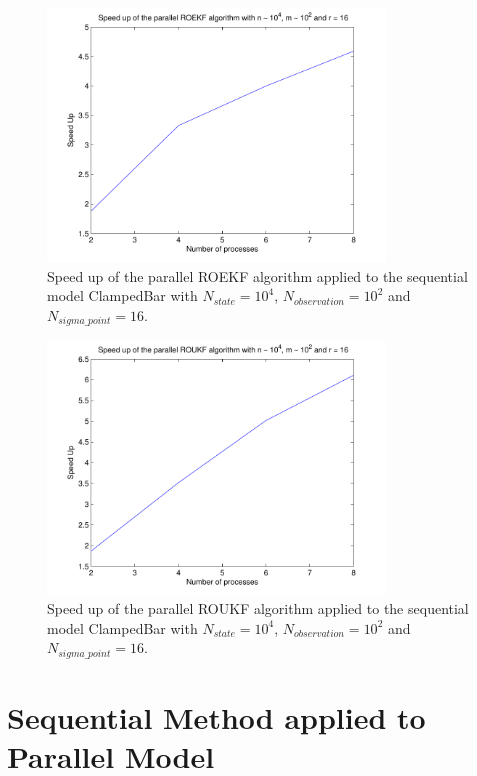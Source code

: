 \begin{figure}
    \caption{\label{titre2} Speed up of the parallel ROEKF algorithm applied to the sequential model ClampedBar with $N_{state} = 10^4$, $N_{observation} = 10^2$ and $N_{sigma\_point} = 16$.}

 \includegraphics[width=0.8\textwidth]{figure/speed_up_roekf.pdf}

   \end{figure}



 \begin{figure}
  \caption{\label{titre3} Speed up of the parallel ROUKF algorithm applied to the sequential model ClampedBar with $N_{state} = 10^4$, $N_{observation} = 10^2$ and $N_{sigma\_point} = 16$.}

\includegraphics[width=0.8\textwidth]{figure/speed_up_roukf.pdf}

\end{figure}


\newpage


\hypertarget{seq-par}{}\section{Sequential Method applied to Parallel Model}\label{seq-par}


